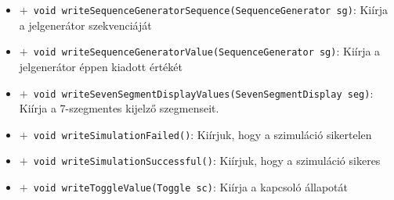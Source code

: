 \begin{itemize}
\begin{itemize}
	\item[] \texttt{$+$ void writeSequenceGeneratorSequence(SequenceGenerator sg)}: Kiírja a jelgenerátor szekvenciáját
	\item[] \texttt{$+$ void writeSequenceGeneratorValue(SequenceGenerator sg)}: Kiírja a jelgenerátor éppen kiadott értékét
	\item[] \texttt{$+$ void writeSevenSegmentDisplayValues(SevenSegmentDisplay seg)}: Kiírja a 7-szegmentes kijelző szegmenseit.
	\item[] \texttt{$+$ void writeSimulationFailed()}: Kiírjuk, hogy a szimuláció sikertelen
	\item[] \texttt{$+$ void writeSimulationSuccessful()}: Kiírjuk, hogy a szimuláció sikeres
	\item[] \texttt{$+$ void writeToggleValue(Toggle sc)}: Kiírja a kapcsoló állapotát
\end{itemize}
\end{itemize}

